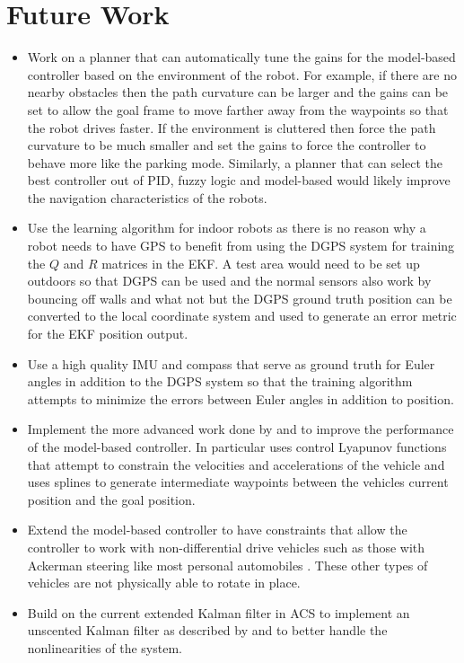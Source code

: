 \chapter{Future Work}
\label{ch:futurework}

\begin{itemize}
\item Work on a planner that can automatically tune the gains for the model-based controller based on the environment of the robot. For example, if there are no nearby obstacles then the path curvature can be larger and the gains can be set to allow the goal frame to move farther away from the waypoints so that the robot drives faster. If the environment is cluttered then force the path curvature to be much smaller and set the gains to force the controller to behave more like the parking mode. Similarly, a planner that can select the best controller out of PID, fuzzy logic and model-based would likely improve the navigation characteristics of the robots.
\item Use the learning algorithm for indoor robots as there is no reason why a robot needs to have GPS to benefit from using the DGPS system for training the $Q$ and $R$ matrices in the EKF. A test area would need to be set up outdoors so that DGPS can be used and the normal sensors also work by bouncing off walls and what not but the DGPS ground truth position can be converted to the local coordinate system and used to generate an error metric for the EKF position output.
\item Use a high quality IMU and compass that serve as ground truth for Euler angles in addition to the DGPS system so that the training algorithm attempts to minimize the errors between Euler angles in addition to position.
\item Implement the more advanced work done by \cite{Lapierre06} and \cite{Gulati08} to improve the performance of the model-based controller. In particular \cite{Gulati08} uses control Lyapunov functions that attempt to constrain the velocities and accelerations of the vehicle and uses splines to generate intermediate waypoints between the vehicles current position and the goal position.
\item Extend the model-based controller to have constraints that allow the controller to work with non-differential drive vehicles such as those with Ackerman steering like most personal automobiles \cite{Shiller91dynamicmotion}. These other types of vehicles are not physically able to rotate in place.
\item Build on the current extended Kalman filter in ACS to implement an unscented Kalman filter as described by \cite{ThrunProbRobots06} and \cite{Orderud05} to better handle the nonlinearities of the system.
\end{itemize}
